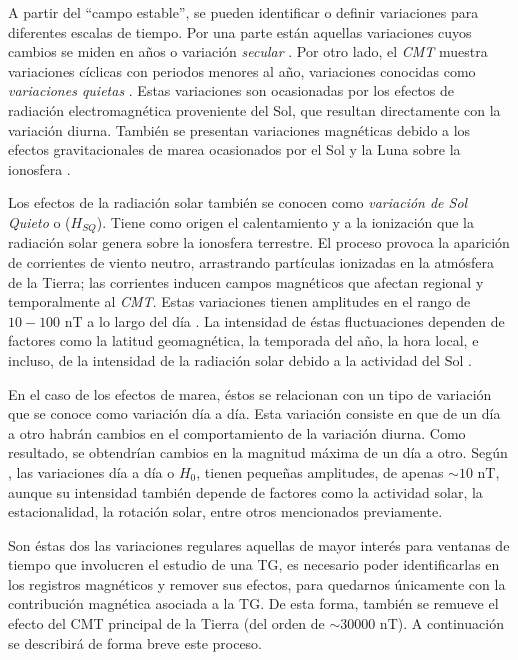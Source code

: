 A partir del ``campo estable'', se pueden identificar o definir variaciones para diferentes escalas de tiempo. Por una parte están aquellas variaciones cuyos cambios se miden en años o variación \emph{secular} \cite{l_handbook_geof_sw_Geom_field}. Por otro lado, el \emph{CMT} muestra variaciones cíclicas con periodos menores al año, variaciones conocidas como \emph{variaciones quietas} \cite{l_handbook_geof_sw_Geom_field}. Estas variaciones son ocasionadas por los efectos de radiación electromagnética proveniente del Sol, que resultan directamente con la variación diurna. También se presentan variaciones magnéticas debido a los efectos gravitacionales de marea ocasionados por el Sol y la Luna sobre la ionosfera \cite{BARTELS_kp}.
\vspace{1 em}

Los efectos de la radiación solar también se conocen como \emph{variación de Sol Quieto} o ($H_{SQ}$). Tiene como origen el calentamiento y a la ionización que la radiación solar genera sobre la ionosfera terrestre. El proceso provoca la aparición de corrientes de viento neutro, arrastrando partículas ionizadas en la atmósfera de la Tierra; las corrientes inducen campos magnéticos que afectan regional y temporalmente al \emph{CMT}. Estas variaciones tienen amplitudes en el rango de $10-100$ nT a lo largo del día \cite{iaga_guide, baseline_Gjerloev}. La intensidad de éstas fluctuaciones dependen de factores como la latitud geomagnética, la temporada del año, la hora local, e incluso, de la intensidad de la radiación solar debido a la actividad del Sol \cite{iaga_guide, gombosi_1998, l_handbook_geof_sw_Geom_field}.\\
\vspace{1 em}

En el caso de los efectos de marea, éstos se relacionan con un tipo de variación que se conoce como variación día a día. Esta variación consiste en que de un día a otro habrán cambios en el comportamiento de la variación diurna. Como resultado, se obtendrían cambios en la magnitud máxima de un día a otro. Según \cite{iaga_guide}, las variaciones día a día o $H_0$, tienen pequeñas amplitudes, de apenas $\sim 10$ nT, aunque su intensidad también depende de factores como la actividad solar, la estacionalidad, la rotación solar, entre otros mencionados previamente. 
\vspace{1 em}

Son éstas dos las variaciones regulares aquellas de mayor interés para ventanas de tiempo que involucren el estudio de una TG, es necesario poder identificarlas en los registros magnéticos y remover sus efectos, para quedarnos únicamente con la contribución magnética asociada a la TG. De esta forma, también se remueve el efecto del CMT principal de la Tierra (del orden de $\sim 30 000$ nT). A continuación se describirá de forma breve este proceso.


